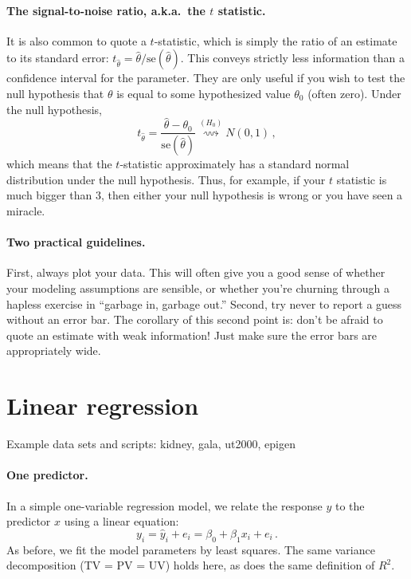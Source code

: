 \documentclass[11pt]{article}
\newcommand{\1}[1]{\mathbf{1}_{\{ {#1} \}}}
\begin{document}
\paragraph{The signal-to-noise ratio, a.k.a.~the $t$ statistic.}  It is also common to quote a $t$-statistic, which is simply the ratio of an estimate to its standard error: $t_{\hat{\theta}} = \hat\theta / \mbox{se}(\hat{\theta})$.  This conveys strictly less information than a confidence interval for the parameter.  They are only useful if you wish to test the null hypothesis that $\theta$ is equal to some hypothesized value $\theta_0$ (often zero).  Under the null hypothesis,
$$
t_{\hat{\theta}} = \frac{\hat\theta -\theta_0} { \mbox{se}(\hat{\theta})} \stackrel{(H_0)}{\rightsquigarrow} N(0,1) \, ,
$$
which means that the $t$-statistic approximately has a standard normal distribution under the null hypothesis.  Thus, for example, if your $t$ statistic is much bigger than $3$, then either your null hypothesis is wrong or you have seen a miracle.

\paragraph{Two practical guidelines.}  First, always plot your data.  This will often give you a good sense of whether your modeling assumptions are sensible, or whether you're churning through a hapless exercise in ``garbage in, garbage out.''  Second, try never to report a guess without an error bar.  The corollary of this second point is: don't be afraid to quote an estimate with weak information!  Just make sure the error bars are appropriately wide.


\section{Linear regression}
Example data sets and scripts: kidney, gala, ut2000, epigen

\paragraph{One predictor.}

In a simple one-variable regression model, we relate the response $y$ to the predictor $x$ using a linear equation:
$$
y_i = \hat{y}_i + e_i = \beta_0 + \beta_1 x_i + e_i \, .
$$
As before, we fit the model parameters by least squares.  The same variance decomposition (TV = PV = UV) holds here, as does the same definition of $R^2$.
\end{document}
